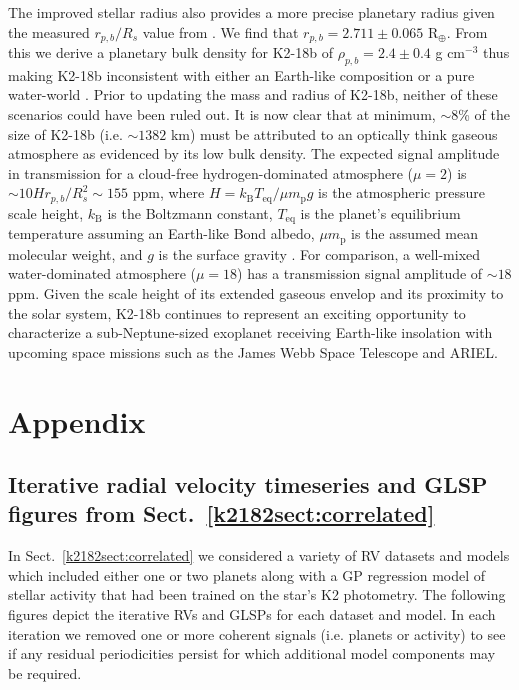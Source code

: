 The improved stellar radius also provides a more precise planetary radius given the measured $r_{p,b}/R_s$
value from \cite{benneke17}.
We find that $r_{p,b}=2.711 \pm 0.065$ R$_{\oplus}$. From this we derive a planetary
bulk density for K2-18b of $\rho_{p,b}=2.4\pm 0.4$ g cm$^{-3}$ thus making K2-18b inconsistent with either an
Earth-like composition or a pure water-world \citep{zeng13}. Prior to updating the mass and radius of K2-18b,
neither of these scenarios could have been ruled out. It is now clear that at minimum, $\sim 8$\% of the size of
K2-18b (i.e. $\sim 1382$ km) must be attributed to an optically think gaseous atmosphere as evidenced by its
low bulk density. The expected signal amplitude in transmission for a cloud-free hydrogen-dominated atmosphere
($\mu=2$) is $\sim 10Hr_{p,b}/R_s^2\sim 155$ ppm,
where $H=k_{\text{B}}T_{\text{eq}}/\mu m_{\text{p}} g$ is the atmospheric pressure scale
height, $k_{\text{B}}$ is the Boltzmann constant, $T_{\text{eq}}$ is the planet's equilibrium temperature assuming
an Earth-like Bond albedo, $\mu m_{\text{p}}$ is the assumed mean molecular weight, and $g$ is the surface gravity 
\citep{kaltenegger09}. For comparison, a well-mixed water-dominated atmosphere ($\mu=18$) has a transmission signal
amplitude of $\sim 18$ ppm. Given the scale height of its extended gaseous envelop and its proximity to the solar
system, K2-18b continues to represent an exciting opportunity
to characterize a sub-Neptune-sized exoplanet receiving Earth-like insolation with upcoming space missions such
as the James Webb Space Telescope and ARIEL.




\section{Appendix}
\subsection{Iterative radial velocity timeseries and GLSP figures from Sect.~\ref{k2182sect:correlated}}
In Sect.~\ref{k2182sect:correlated} we considered a variety of RV datasets and models which included either
one or two planets along with a GP regression model of stellar activity that had been trained on the star's
K2 photometry. The following figures depict the iterative RVs and GLSPs for each dataset and model. In
each iteration we removed one or more coherent signals (i.e. planets or activity) to see if any residual
periodicities persist for which additional model components may be required.


